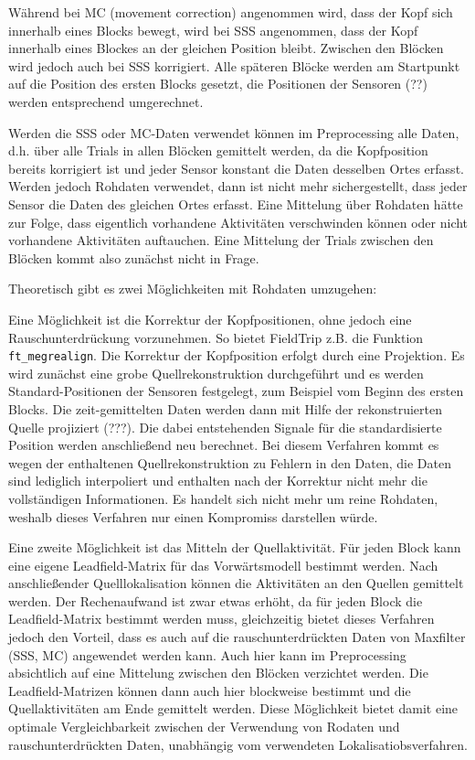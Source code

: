 \documentclass[doc,a4paper,12pt]{apa6}
\begin{document}
Während bei MC (movement correction) angenommen wird, dass der Kopf sich innerhalb eines Blocks bewegt, wird bei SSS angenommen, dass der Kopf innerhalb eines Blockes an der gleichen Position bleibt. Zwischen den Blöcken wird jedoch auch bei SSS korrigiert. Alle späteren Blöcke werden am Startpunkt auf die Position des ersten Blocks gesetzt, die Positionen der Sensoren (??) werden entsprechend umgerechnet.

Werden die SSS oder MC-Daten verwendet können im Preprocessing alle Daten, d.h. über alle Trials in allen Blöcken gemittelt werden, da die Kopfposition bereits korrigiert ist und jeder Sensor konstant die Daten desselben Ortes erfasst. Werden jedoch Rohdaten verwendet, dann ist nicht mehr sichergestellt, dass jeder Sensor die Daten des gleichen Ortes erfasst. Eine Mittelung über Rohdaten hätte zur Folge, dass eigentlich vorhandene Aktivitäten verschwinden können oder nicht vorhandene Aktivitäten auftauchen. Eine Mittelung der Trials zwischen den Blöcken kommt also zunächst nicht in Frage.

Theoretisch gibt es zwei Möglichkeiten mit Rohdaten umzugehen:

Eine Möglichkeit ist die Korrektur der Kopfpositionen, ohne jedoch eine Rauschunterdrückung vorzunehmen. So bietet FieldTrip z.B. die Funktion \texttt{ft\_megrealign}. Die Korrektur der Kopfposition erfolgt durch eine Projektion. Es wird zunächst eine grobe Quellrekonstruktion durchgeführt und es werden Standard-Positionen der Sensoren festgelegt, zum Beispiel vom Beginn des ersten Blocks. Die zeit-gemittelten Daten werden dann mit Hilfe der rekonstruierten Quelle projiziert (???). Die dabei entstehenden Signale für die standardisierte Position werden anschließend neu berechnet. Bei diesem Verfahren kommt es wegen der enthaltenen Quellrekonstruktion zu Fehlern in den Daten, die Daten sind lediglich interpoliert und enthalten nach der Korrektur nicht mehr die vollständigen Informationen. Es handelt sich nicht mehr um reine Rohdaten, weshalb dieses Verfahren nur einen Kompromiss darstellen würde.

Eine zweite Möglichkeit ist das Mitteln der Quellaktivität. Für jeden Block kann eine eigene Leadfield-Matrix für das Vorwärtsmodell bestimmt werden. Nach anschließender Quelllokalisation können die Aktivitäten an den Quellen gemittelt werden. Der Rechenaufwand ist zwar etwas erhöht, da für jeden Block die Leadfield-Matrix bestimmt werden muss, gleichzeitig bietet dieses Verfahren jedoch den Vorteil, dass es auch auf die rauschunterdrückten Daten von Maxfilter (SSS, MC) angewendet werden kann. Auch hier kann im Preprocessing absichtlich auf eine Mittelung zwischen den Blöcken verzichtet werden. Die Leadfield-Matrizen können dann auch hier blockweise bestimmt und die Quellaktivitäten am Ende gemittelt werden. Diese Möglichkeit bietet damit eine optimale Vergleichbarkeit zwischen der Verwendung von Rodaten und rauschunterdrückten Daten, unabhängig vom verwendeten Lokalisatiobsverfahren.
\end{document}
